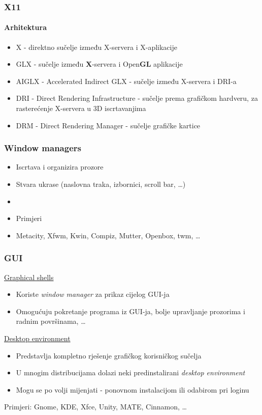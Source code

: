 \documentclass[t,table,usenames,dvipsnames]{beamer}
\begin{document}
\begin{frame}
	\frametitle{X11}
	\framesubtitle{Arhitektura}
	\begin{itemize}
		\item X - direktno sučelje između X-servera i X-aplikacije
		\item GLX - sučelje između \textbf{X}-servera i Open\textbf{GL} aplikacije
		\item AIGLX - Accelerated Indirect GLX - sučelje između X-servera i DRI-a
		\item DRI - Direct Rendering Infrastructure - sučelje prema grafičkom hardveru, za rasterećenje X-servera u 3D iscrtavanjima
		\item DRM - Direct Rendering Manager - sučelje grafičke kartice
	\end{itemize}

\end{frame}



\begin{frame}
	\frametitle{Window managers}
	\begin{itemize}
		\item Iscrtava i organizira prozore
		\item Stvara ukrase (naslovna traka, izbornici, scroll bar, \ldots)
		\item[]
		\item[] Primjeri
		\item[] Metacity, Xfwm, Kwin, Compiz, Mutter, Openbox, twm, \ldots
	\end{itemize}
\end{frame}


\begin{frame}
	\frametitle{GUI}
	\underline{Graphical shells}
	\begin{itemize}
		\item Koriste \textit{window manager} za prikaz cijelog GUI-ja
		\item Omogućuju pokretanje programa iz GUI-ja, bolje upravljanje prozorima i radnim površinama, \ldots
	\end{itemize}
	\underline{Desktop environment}
	\begin{itemize}
		\item Predstavlja kompletno rješenje grafičkog korisničkog sučelja
		\item U mnogim distribucijama dolazi neki predinstalirani \textit{desktop environment}
		\item Mogu se po volji mijenjati - ponovnom instalacijom ili odabirom pri loginu
	\end{itemize}
	
	Primjeri: Gnome, KDE, Xfce, Unity, MATE, Cinnamon, \ldots

\end{frame}
\end{document}
